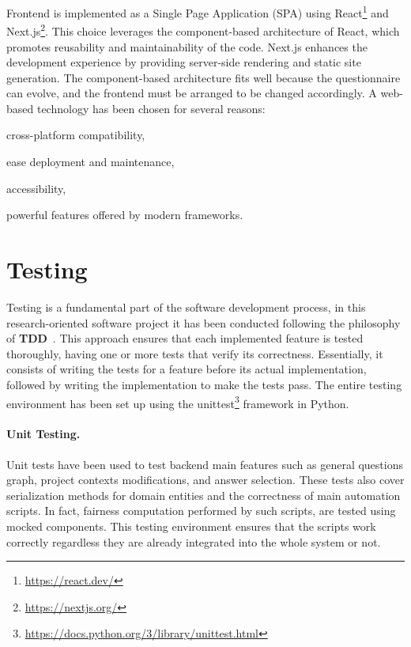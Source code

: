 \documentclass[12pt,a4paper,openright,twoside]{book}
\begin{document}
Frontend is implemented as a Single Page Application (SPA) using React\footnote{\href{https://react.dev/}{https://react.dev/}} and Next.js\footnote{\href{https://nextjs.org/}{https://nextjs.org/}}.
%
This choice leverages the component-based architecture of React, which promotes reusability and maintainability of the code.
%
Next.js enhances the development experience by providing server-side rendering and static site generation.
%
The component-based architecture fits well because the questionnaire can evolve, and the frontend must be arranged to be changed accordingly.
%
A web-based technology has been chosen for several reasons:
\begin{enumerate*}[label=(\roman*)]
    \item cross-platform compatibility,
    \item ease deployment and maintenance,
    \item accessibility,
    \item powerful features offered by modern frameworks.
\end{enumerate*}



\section{Testing}

Testing is a fundamental part of the software development process, in this research-oriented software project it has been conducted following the philosophy of \textbf{\ac{TDD}}~\cite{beck2022test}.
%
This approach ensures that each implemented feature is tested thoroughly,
having one or more tests that verify its correctness.
%
Essentially, it consists of writing the tests for a feature before its actual implementation, followed by writing the implementation to make the tests pass.
%
The entire testing environment has been set up using the unittest\footnote{\href{https://docs.python.org/3/library/unittest.html}{https://docs.python.org/3/library/unittest.html}} framework in Python.


\paragraph{Unit Testing.}

Unit tests have been used to test backend main features such as general questions graph, project contexts modifications, and answer selection.
%
These tests also cover serialization methods for domain entities and the correctness of main automation scripts.
%
In fact, fairness computation performed by such scripts, are tested using mocked components.
%
This testing environment ensures that the scripts work correctly regardless they are already integrated into the whole system or not.
\end{document}
